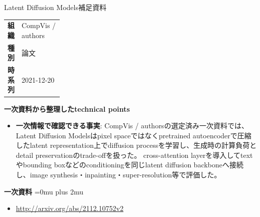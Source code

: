 \begin{technicalnote}{Latent Diffusion Models}{補足資料}
\begingroup
\begin{tabularx}{\linewidth}{@{}>{\bfseries}p{0.22\linewidth}X@{}}
組織 & CompVis / authors \\
種別 & 論文 \\
時系列 & 2021-12-20 \\
\end{tabularx}
\smallskip
\begin{minipage}{\linewidth}
{\bfseries 一次資料から整理したtechnical points}
\begin{itemize}[leftmargin=1.5em,itemsep=0.35em]
\item \textbf{一次情報で確認できる事実}: CompVis / authorsの選定済み一次資料では、Latent Diffusion Modelsはpixel spaceではなくpretrained autoencoderで圧縮したlatent representation上でdiffusion processを学習し、生成時の計算負荷とdetail preservationのtrade-offを扱った。 cross-attention layerを導入してtextやbounding boxなどのconditioningを同じlatent diffusion backboneへ接続し、image synthesis・inpainting・super-resolution等で評価した。
\end{itemize}
\begin{minipage}{\linewidth}
\begin{samepage}
{\bfseries 一次資料}
\begingroup\sloppy
\Urlmuskip=0mu plus 2mu\relax
\begin{itemize}[leftmargin=1.5em,itemsep=0.25em]
\item {\scriptsize\url{http://arxiv.org/abs/2112.10752v2}}
\end{itemize}
\endgroup
\end{samepage}
\end{minipage}
\end{minipage}
\endgroup
\end{technicalnote}
\medskip

